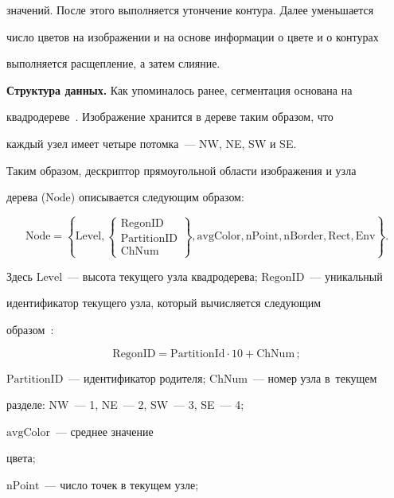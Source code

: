 значений. После этого выполняется утончение контура. Далее уменьшается 

число цветов на изображении и на основе информации о цвете и о контурах 

выполняется расщепление, а затем слияние.

  

  \textbf{Структура данных.} Как упоминалось ранее, сегментация основана на 

квадродереве~\cite{9-sor}. Изображение хранится в дереве таким образом, что 

каждый узел имеет четыре потомка~--- NW, NE, SW и SE.

  

  Таким образом, дескриптор прямоугольной области изображения и узла 

дерева ($\mathrm{Node}$) описывается следующим образом:

  $$

  \mathrm{Node}= \left\{ \mathrm{Level}, \left\{ \begin{matrix}

  \mathrm{RegonID}\\ \mathrm{PartitionID}\\ \mathrm{ChNum} \end{matrix}\right\},

  \mathrm{avgColor, nPoint, nBorder, Rect, Env}\right\}.

  $$

Здесь $\mathrm{Level}$~---  высота текущего узла квадродерева; $\mathrm{RegonID}$~--- уникальный 

идентификатор текущего узла, который вычисляется следующим 

образом~\cite{10-sor}:

\begin{equation}

\mathrm{RegonID= PartitionId \cdot 10 +ChNum}\,;

\label{e2-sor}

\end{equation}

$\mathrm{PartitionID}$~--- идентификатор родителя; $\mathrm{ChNum}$~--- номер узла в~текущем 

разделе: NW~--- 1, NE~--- 2, SW~--- 3, SE~--- 4; 

$\mathrm{avgColor}$~--- среднее значение 

цвета;

  $\mathrm{nPoint}$~--- число точек в текущем узле;

